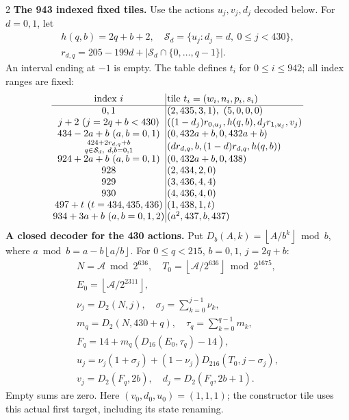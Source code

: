 \documentclass[10pt]{article}
\newcommand{\fl}[1]{\left\lfloor#1\right\rfloor}
\newcommand{\rg}[2]{\{#1,\ldots,#2\}}
\begin{document}
\begin{multicols}{2}
\textbf{The 943 indexed fixed tiles.}
Use the actions $u_j,v_j,d_j$ decoded below. For $d=0,1$, let
\[
\begin{gathered}
h(q,b)=2q+b+2,\quad
\mathcal S_d=\{u_j:d_j=d,\ 0\le j<430\},\\
r_{d,q}=205-199d+|\mathcal S_d\cap\rg0{q-1}|.
\end{gathered}
\]
An interval ending at $-1$ is empty. The table defines $t_i$ for
$0\le i\le942$; all index ranges are fixed:
\[
\setlength{\arraycolsep}{1.4pt}\begin{array}{c|l}
\text{index }i&\text{tile }t_i=(w_i,n_i,p_i,s_i)\\\hline
0,1&(2,435,3,1),\ (5,0,0,0)\\
j+2\ (j=2q+b<430)&((1-d_j)r_{0,u_j},h(q,b),d_jr_{1,u_j},v_j)\\
434-2a+b\ (a,b=0,1)&(0,432a+b,0,432a+b)\\
\substack{424+2r_{d,q}+b\\q\in\mathcal S_d,\ d,b=0,1}&(dr_{d,q},b,(1-d)r_{d,q},h(q,b))\\
924+2a+b\ (a,b=0,1)&(0,432a+b,0,438)\\
928&(2,434,2,0)\\
929&(3,436,4,4)\\
930&(4,436,4,0)\\
497+t\ (t=434,435,436)&(1,438,1,t)\\
934+3a+b\ (a,b=0,1,2)&(a^2,437,b,437)
\end{array}
\]
\textbf{A closed decoder for the 430 actions.}
Put $D_b(A,k)=\fl{A/b^k}\bmod b$, where
$a\bmod b=a-b\fl{a/b}$. For $0\le q<215$, $b=0,1$, $j=2q+b$:
\[
\begin{gathered}
N=\mathcal A\bmod2^{636},\quad
T_0=\fl{\mathcal A/2^{636}}\bmod2^{1675},\\
E_0=\fl{\mathcal A/2^{2311}},\\
\nu_j=D_2(N,j),\quad \sigma_j=\sum_{k=0}^{j-1}\nu_k,\\
m_q=D_2(N,430+q),\quad \tau_q=\sum_{k=0}^{q-1}m_k,\\
F_q=14+m_q(D_{16}(E_0,\tau_q)-14),\\
u_j=\nu_j(1+\sigma_j)+(1-\nu_j)D_{216}(T_0,j-\sigma_j),\\
v_j=D_2(F_q,2b),\quad d_j=D_2(F_q,2b+1).
\end{gathered}
\]
Empty sums are zero. Here $(v_0,d_0,u_0)=(1,1,1)$; the constructor tile
uses this actual first target, including its state renaming.


\end{multicols}
\end{document}
